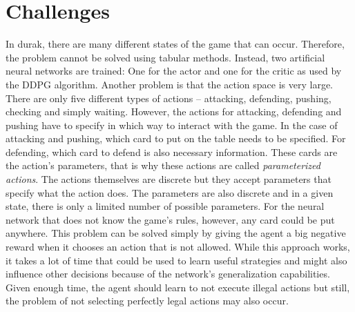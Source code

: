 \documentclass[a4paper,titlepage]{article}
\begin{document}
\newpage

\section{Challenges}

\label{sec:challenges}
In durak, there are many different states of the game that can occur. Therefore, the problem cannot be solved using tabular methods. Instead, two artificial neural networks are trained: One for the actor and one for the critic as used by the DDPG algorithm.
Another problem is that the action space is very large. There are only five different types of actions -- attacking, defending, pushing, checking and simply waiting. However, the actions for attacking, defending and pushing have to specify in which way to interact with the game. In the case of attacking and pushing, which card to put on the table needs to be specified. For defending, which card to defend is also necessary information. These cards are the action's parameters, that is why these actions are called \emph{parameterized actions}. The actions themselves are discrete but they accept parameters that specify what the action does. The parameters are also discrete and in a given state, there is only a limited number of possible parameters. For the neural network that does not know the game's rules, however, any card could be put anywhere. This problem can be solved simply by giving the agent a big negative reward when it chooses an action that is not allowed. While this approach works, it takes a lot of time that could be used to learn useful strategies and might also influence other decisions because of the network's generalization capabilities. Given enough time, the agent should learn to not execute illegal actions but still, the problem of not selecting perfectly legal actions may also occur.
\end{document}
